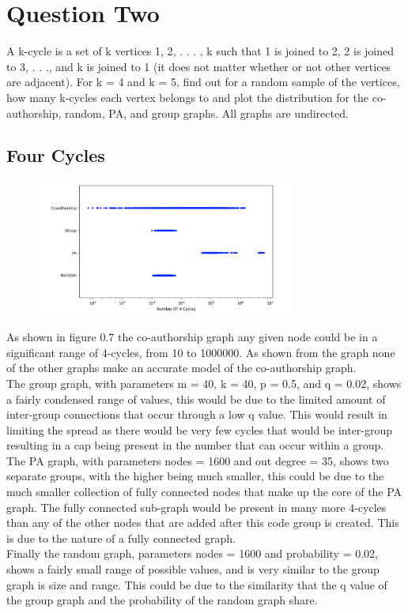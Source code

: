 \documentclass[paper=a4, fontsize=11pt]{scrartcl}
\numberwithin{equation}{section}		%
\numberwithin{figure}{section}			%
\numberwithin{table}{section}				%
\begin{document}
\section*{Question Two}

A k-cycle is a set of k vertices {1, 2, . . . , k} such that 1 is joined to 2, 2 is joined to 3, . . .,
and k is joined to 1 (it does not matter whether or not other vertices are adjacent). For k = 4 and k = 5, find out for a random sample of the vertices, how many k-cycles each vertex belongs to and plot the distribution for the co-authorship, random, PA, and group graphs. All graphs are undirected.

\subsection*{Four Cycles}

\begin{figure}[h]
\center
\caption{}
\includegraphics[width=0.75\textwidth]{pictures/4cycle.png}
\end{figure}

As shown in figure 0.7 the co-authorship graph any given node could be in a significant range of 4-cycles, from 10 to 1000000. As shown from the graph none of the other graphs make an accurate model of the co-authorship graph. \\
The group graph, with parameters m = 40, k = 40, p = 0.5, and q = 0.02, shows a fairly condensed range of values, this would be due to the limited amount of inter-group connections that occur through a low q value. This would result in limiting the spread as there would be very few cycles that would be inter-group resulting in a cap being present in the number that can occur within a group.\\
The PA graph, with parameters nodes = 1600 and out degree = 35, shows two separate groups, with the higher being much smaller, this could be due to the much smaller collection of fully connected nodes that make up the core of the PA graph. The fully connected sub-graph would be present in many more 4-cycles than any of the other nodes that are added after this code group is created. This is due to the nature of a fully connected graph. \\
Finally the random graph, parameters nodes = 1600 and probability = 0.02, shows a fairly small range of possible values, and is very similar to the group graph is size and range. This could be due to the similarity that the q value of the group graph and the probability of the random graph share. 
\end{document}
